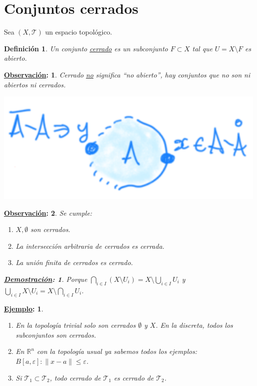 \documentclass[10pt,a4paper,openright]{book}
\theoremstyle{break}
\newtheorem*{defi}{Definición}
\newtheorem*{demo}{\underline{Demostración}:}
\newtheorem*{obs}{\underline{Observación}:}
\newtheorem*{ej}{\underline{Ejemplo}:}
\begin{document}
\section{Conjuntos cerrados}%
\label{sec:conjuntos_cerrados}
Sea $\left( X, \mathcal{T} \right)$ un espacio topológico.
\begin{defi}
Un conjunto \underline{cerrado} es un subconjunto $F \subset X$ tal que $U = X \setminus F$ es abierto.
\end{defi}
\begin{obs}
    Cerrado \underline{no} significa ``no abierto'', hay conjuntos que no son ni abiertos ni cerrados.
    \begin{center}
        \includegraphics[scale=0.3]{images/def_cerrados} 
    \end{center}
\end{obs}
\begin{obs}
Se cumple:
\begin{enumerate}
    \item $X, \emptyset$ son cerrados.
    \item La intersección arbitraria de cerrados es cerrada.
    \item La unión finita de cerrados es cerrado.
\end{enumerate}
\begin{demo}
    Porque $\bigcap_{i \in  I} \left( X \setminus U_i \right) = X \setminus \bigcup_{i \in  I} U_i$ y $\bigcup_{i \in  I} X \setminus U_i = X \setminus \bigcap_{i \in  I} U_i$.
\end{demo}
\end{obs}

\begin{ej}
\begin{enumerate}
    \item En la topología trivial solo son cerrados $\emptyset$ y $X$. En la discreta, todos los subconjuntos son cerrados.
    \item En $\mathbb{R}^n$ con la topología usual ya sabemos todos los ejemplos: $B\left[ a, \varepsilon \right] : \lVert x - a \rVert \le \varepsilon$.
    \item Si $\mathcal{T}_1 \subset \mathcal{T}_2$, todo cerrado de $\mathcal{T}_1$ es cerrado de $\mathcal{T}_2$. 
\end{enumerate}
\end{ej}
\end{document}
